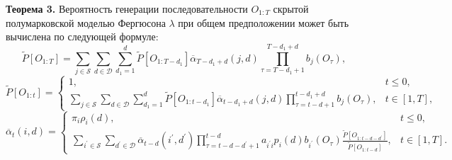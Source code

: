 \documentclass[twoside,12pt]{article}
\begin{document}
\textbf{Теорема 3.}
Вероятность генерации последовательности $O_{1:T}$ скрытой полумарковской моделью Фергюсона $\lambda$ при общем предположении может быть вычислена по следующей формуле:
\begin{equation}\nonumber
\widetilde{P}[O_{1:T}]=\sum\limits_{j\in \mathcal{S}}\sum\limits_{d \in \mathcal{D}}\sum\limits_{d_1=1}^{d}\widetilde{P}[O_{1:T-d_1}]\overline{\alpha}_{T-d_1+d}(j,d)\prod\limits_{\tau=T-d_1+1}^{T-d_1+d} b_{j}(O_\tau),
\end{equation}
\begin{equation}\nonumber
\widetilde{P}[O_{1:t}]=\left\{
\begin{array}{ll}
1 ,&t\leq 0,\\
\sum\limits_{j\in \mathcal{S}}\sum\limits_{d \in \mathcal{D}}\sum\limits_{d_1=1}^{d}\widetilde{P}[O_{1:t-d_1}]\overline{\alpha}_{t-d_1+d}(j,d) \prod\limits_{\tau=t-d+1}^{t-d_1+d} b_{j}(O_\tau),& t\in [1,T],\end{array}\right.
\end{equation}
\begin{equation}\nonumber
\overline{\alpha}_{t}(i,d)=\left\{
\begin{array}{ll}
\pi_i\rho_i(d), &t\leq 0,\\
\sum\limits_{i^\prime\in \mathcal{S}}\sum\limits_{d^\prime \in \mathcal{D}}\overline{\alpha}_{t-d}(i^\prime,d^\prime)\prod\limits_{\tau=t-d-d^\prime+1}^{t-d}a_{i^\prime i} p_i(d)b_{i^\prime}(O_\tau)\frac{\widetilde{P}[O_{1:t-d-d^\prime}]}{\widetilde{P}[O_{1:t-d}]}
, & t\in [1,T].
\end{array}\right.
\end{equation}
\end{document}
